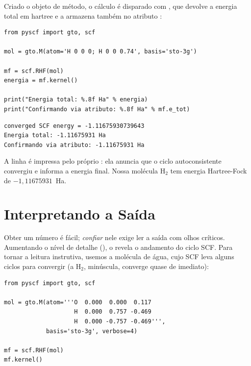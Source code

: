 \noindent
Criado o objeto de método, o cálculo é disparado com , que devolve a
energia total em hartree e a armazena também no atributo :

\begin{lstlisting}[style=python,caption={Um cálculo Hartree-Fock completo da H$_2$.},label={lst:hfcompleto}]
from pyscf import gto, scf

mol = gto.M(atom='H 0 0 0; H 0 0 0.74', basis='sto-3g')

mf = scf.RHF(mol)
energia = mf.kernel()

print("Energia total: %.8f Ha" % energia)
print("Confirmando via atributo: %.8f Ha" % mf.e_tot)
\end{lstlisting}

\begin{lstlisting}[style=console]
converged SCF energy = -1.11675930739643
Energia total: -1.11675931 Ha
Confirmando via atributo: -1.11675931 Ha
\end{lstlisting}

\noindent
A linha  é impressa pelo próprio \pyscf{}: ela
anuncia que o ciclo autoconsistente convergiu e informa a energia final. Nossa
molécula H$_2$ tem energia Hartree-Fock de $-1{,}11675931$~Ha.

\section{Interpretando a Saída}
\label{sec:saida}

Obter um número é fácil; \emph{confiar} nele exige ler a saída com olhos críticos.
Aumentando o nível de detalhe (), o \pyscf{} revela o andamento do
ciclo SCF. Para tornar a leitura instrutiva, usemos a molécula de água, cujo SCF
leva alguns ciclos para convergir (a H$_2$, minúscula, converge quase de
imediato):

\begin{lstlisting}[style=python,caption={Acompanhando a convergência do SCF.},label={lst:h2o}]
from pyscf import gto, scf

mol = gto.M(atom='''O  0.000  0.000  0.117
                    H  0.000  0.757 -0.469
                    H  0.000 -0.757 -0.469''',
            basis='sto-3g', verbose=4)

mf = scf.RHF(mol)
mf.kernel()
\end{lstlisting}

